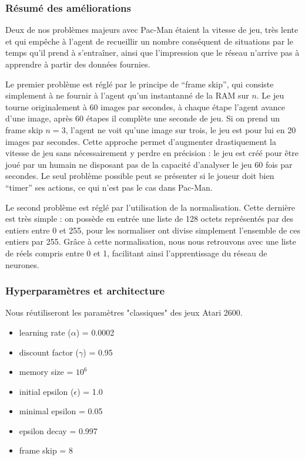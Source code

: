 \subsubsection{Résumé des améliorations}
Deux de nos problèmes majeurs avec Pac-Man étaient la vitesse de jeu, très lente et qui empêche à l'agent de recueillir un nombre conséquent de situations par le temps qu'il prend à s'entraîner, ainsi que l'impression que le réseau n'arrive pas à apprendre à partir des données fournies.
\par
Le premier problème est réglé par le principe de ``frame skip'', qui consiste simplement à ne fournir à l'agent qu'un instantanné de la RAM sur $n$. Le jeu tourne originalement à 60 images par secondes, à chaque étape l'agent avance d'une image, après 60 étapes il complète une seconde de jeu. Si on prend un frame skip $n=3$, l'agent ne voit qu'une image sur trois, le jeu est pour lui en 20 images par secondes. Cette approche permet d'augmenter drastiquement la vitesse de jeu sans nécessairement y perdre en précision : le jeu est créé pour être joué par un humain ne disposant pas de la capacité d'analyser le jeu 60 fois par secondes. Le seul problème possible peut se présenter si le joueur doit bien ``timer'' ses actions, ce qui n'est pas le cas dans Pac-Man.
\par
Le second problème est réglé par l'utilisation de la normalisation. Cette dernière est très simple : on possède en entrée une liste de 128 octets représentés par des entiers entre 0 et 255, pour les normaliser ont divise simplement l'ensemble de ces entiers par 255. Grâce à cette normalisation, nous nous retrouvons avec une liste de réels compris entre 0 et 1, facilitant ainsi l'apprentissage du réseau de neurones.

\subsubsection{Hyperparamètres et architecture}

Nous réutiliseront les paramètres "classiques" des jeux Atari 2600.

\begin{itemize}
\item learning rate ($\alpha$) = 0.0002
\item discount factor ($\gamma$) = 0.95
\item memory size = $10^6$
\item initial epsilon ($\epsilon$) = 1.0
\item minimal epsilon = 0.05
\item epsilon decay  = 0.997
\item frame skip = 8
\end{itemize}

